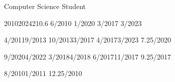 \documentclass[11pt]{thyv}
\begin{document}
\begin{textblock}{5}
		{Computer Science Student}

		\strut

	\begin{thyV}{2010}{2024}{21}{0.6\linewidth}
		 				{6/2010}
		 							{1/2020}
		 						{3/2017}
		 						{3/2023}
		
		 	{4/2011}{9/2013} 	{}
		 			{10/2013}{3/2017} 	{}%
		 			{4/2017}{3/2023} 	{7.25/2020}

		 			{9/2020}{4/2022} 	{}
		 					{3/2018}{4/2018} 	{}
		 				{6/2017}{11/2017} 	{9.25/2017}

		 	{8/2010}{1/2011} 	{12.25/2010}
	\end{thyV}

	\end{textblock}
\end{document}
